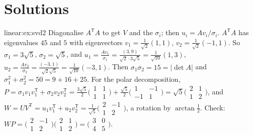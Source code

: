 \section{Solutions}

\begin{solution}{linear:ex:svd2}
\idea Diagonalise $A^{\mathsf T}A$ to get $V$ and the $\sigma_i$; then $u_i=Av_i/\sigma_i$.
\writeup $A^{\mathsf T}A$ has eigenvalues $45$ and $5$ with eigenvectors $v_1=\frac1{\sqrt2}(1,1)$, $v_2=\frac1{\sqrt2}(-1,1)$.
So $\sigma_1=3\sqrt5$, $\sigma_2=\sqrt5$, and $u_1=\frac{Av_1}{\sigma_1}=\frac{(3,9)}{\sqrt2\cdot3\sqrt5}=\frac1{\sqrt{10}}(1,3)$,
$u_2=\frac{Av_2}{\sigma_2}=\frac{(-3,1)}{\sqrt2\sqrt5}=\frac1{\sqrt{10}}(-3,1)$. Then $\sigma_1\sigma_2=15=|\det A|$ and
$\sigma_1^2+\sigma_2^2=50=9+16+25$. For the polar decomposition, $P=\sigma_1v_1v_1^{\mathsf T}+\sigma_2v_2v_2^{\mathsf T}
=\frac{3\sqrt5}2\bigl(\begin{smallmatrix}1&1\\1&1\end{smallmatrix}\bigr)+\frac{\sqrt5}2\bigl(\begin{smallmatrix}1&-1\\-1&1\end{smallmatrix}\bigr)
=\sqrt5\bigl(\begin{smallmatrix}2&1\\1&2\end{smallmatrix}\bigr)$, and
$W=UV^{\mathsf T}=u_1v_1^{\mathsf T}+u_2v_2^{\mathsf T}=\frac1{\sqrt5}\bigl(\begin{smallmatrix}2&-1\\1&2\end{smallmatrix}\bigr)$, a
rotation by $\arctan\frac12$. Check: $WP=\bigl(\begin{smallmatrix}2&-1\\1&2\end{smallmatrix}\bigr)\bigl(\begin{smallmatrix}2&1\\1&2
\end{smallmatrix}\bigr)=\bigl(\begin{smallmatrix}3&0\\4&5\end{smallmatrix}\bigr)$.
\end{solution}

